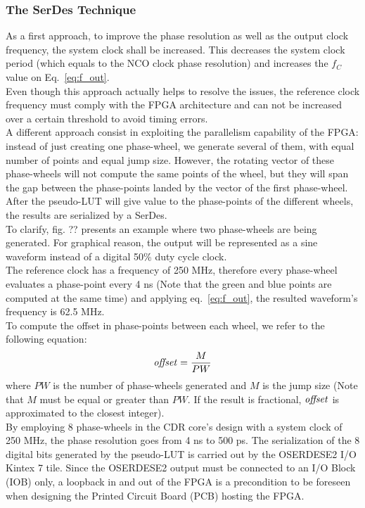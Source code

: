 \documentclass[11pt]{article}
\renewcommand{\>}{\rangle} \renewcommand{\emptyset}{\varnothing}
\begin{document}
\subsubsection{The SerDes Technique}
As a first approach, to improve the phase resolution as well as the output clock
frequency, the system clock shall be increased. This decreases the system clock
period (which equals to the NCO clock phase resolution) and increases the $f_C$
value on Eq.~\ref{eq:f_out}.\\
Even though this approach actually helps to resolve the issues, the reference
clock frequency must comply with the FPGA architecture and can not be increased
over a certain threshold to avoid timing errors.\\
A different approach consist in exploiting the parallelism capability of the
FPGA: instead of just creating one phase-wheel, we generate several of them,
with equal number of points and equal jump size. However, the rotating vector of
these phase-wheels will not compute the same points of the wheel, but they will
span the gap between the phase-points landed by the vector of the first
phase-wheel. After the pseudo-LUT will give value to the phase-points of the
different
wheels, the results are serialized by a SerDes.\\
To clarify, fig. ?? presents an example where two phase-wheels are being
generated. For graphical reason, the output will be
represented as a sine waveform instead of a digital 50\% duty cycle clock.\\
The reference clock has a frequency of 250 MHz, therefore every phase-wheel
evaluates a phase-point every 4 ns (Note that the green and blue points are
computed at the same time) and applying eq.~\ref{eq:f_out}, the resulted
waveform's frequency is 62.5 MHz.\\
To compute the offset in phase-points between each wheel, we refer to the
following equation:
\begin{equation}
  \text{\textit{offset}} = \frac{M}{PW}
  \label{eq:offset}
\end{equation}
where $PW$ is the number of phase-wheels generated and $M$ is the jump size
(Note that $M$ must be equal or greater than $PW$. If the result is fractional,
$\text{\textit{offset}}$ is approximated to the closest integer).\\
By employing 8 phase-wheels in the CDR core's design with a system clock of 250
MHz, the phase resolution goes from 4 ns to 500 ps. The serialization of the 8
digital bits generated by the pseudo-LUT is carried out by the OSERDESE2 I/O
Kintex 7 tile. Since the OSERDESE2 output must be connected to an I/O Block
(IOB) only, a loopback in and out of the FPGA is a precondition to be foreseen
when designing the Printed Circuit
Board (PCB) hosting the FPGA.\\
\end{document}
